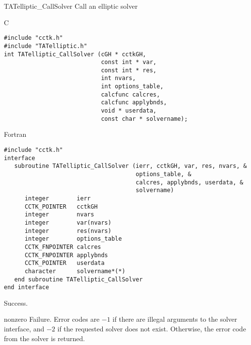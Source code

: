\begin{FunctionDescription}{TATelliptic\_CallSolver}
\label{TATelliptic-CallSolver}
Call an elliptic solver

\begin{SynopsisSection}
\begin{Synopsis}{C}
\begin{verbatim}
#include "cctk.h"
#include "TATelliptic.h"
int TATelliptic_CallSolver (cGH * cctkGH,
                            const int * var,
                            const int * res,
                            int nvars,
                            int options_table,
                            calcfunc calcres,
                            calcfunc applybnds,
                            void * userdata,
                            const char * solvername);
\end{verbatim}
\end{Synopsis}
\begin{Synopsis}{Fortran}
\begin{verbatim}
#include "cctk.h"
interface
   subroutine TATelliptic_CallSolver (ierr, cctkGH, var, res, nvars, &
                                      options_table, &
                                      calcres, applybnds, userdata, &
                                      solvername)
      integer        ierr
      CCTK_POINTER   cctkGH
      integer        nvars
      integer        var(nvars)
      integer        res(nvars)
      integer        options_table
      CCTK_FNPOINTER calcres
      CCTK_FNPOINTER applybnds
      CCTK_POINTER   userdata
      character      solvername*(*)
   end subroutine TATelliptic_CallSolver
end interface
\end{verbatim}
\end{Synopsis}
\end{SynopsisSection}

\begin{ResultSection}
\begin{Result}{0}
Success.
\end{Result}
\begin{Result}{nonzero}
Failure.  Error codes are $-1$ if there are illegal arguments to the
solver interface, and $-2$ if the requested solver does not exist.
Otherwise, the error code from the solver is returned.
\end{Result}
\end{ResultSection}


\end{FunctionDescription}
